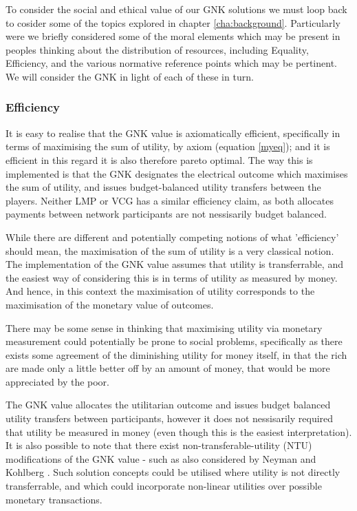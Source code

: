 To consider the social and ethical value of our GNK solutions we must loop back to cosider some of the topics explored in chapter \ref{cha:background}.
Particularly were we briefly considered some of the moral elements which may be present in peoples thinking about the distribution of resources, including Equality, Efficiency, and the various normative reference points which may be pertinent.
We will consider the GNK in light of each of these in turn.

\subsubsection*{Efficiency}
It is easy to realise that the GNK value is axiomatically efficient, specifically in terms of maximising the sum of utility, by axiom (equation \ref{myeq}); and it is efficient in this regard it is also therefore pareto optimal.
The way this is implemented is that the GNK designates the electrical outcome which maximises the sum of utility, and issues budget-balanced utility transfers between the players.
Neither LMP or VCG has a similar efficiency claim, as both allocates payments between network participants are not nessisarily budget balanced.

While there are different and potentially competing notions of what 'efficiency' should mean, the maximisation of the sum of utility is a very classical notion.
The implementation of the GNK value assumes that utility is transferrable, and the easiest way of considering this is in terms of utility as measured by money. And hence, in this context the maximisation of utility corresponds to the maximisation of the monetary value of outcomes.

There may be some sense in thinking that maximising utility via monetary measurement could potentially be prone to social problems, specifically as there exists some agreement of the diminishing utility for money itself, in that the rich are made only a little better off by an amount of money, that would be more appreciated by the poor.

The GNK value allocates the utilitarian outcome and issues budget balanced utility transfers between participants, however it does not nessisarily required that utility be measured in money (even though this is the easiest interpretation).
It is also possible to note that there exist non-transferable-utility (NTU) modifications of the GNK value - such as also considered by Neyman and Kohlberg \cite{value1}.
Such solution concepts could be utilised where utility is not directly transferrable, and which could incorporate non-linear utilities over possible monetary transactions.

